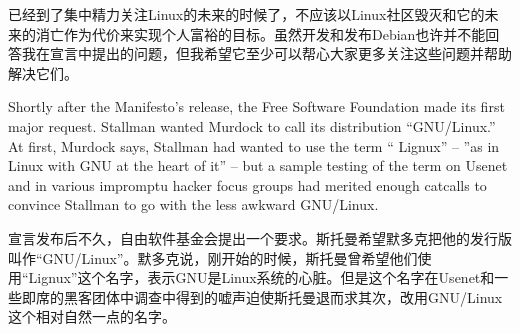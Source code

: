 \ifdefined\chs
已经到了集中精力关注Linux的未来的时候了，不应该以Linux社区毁灭和它的未来的消亡作为代价来实现个人富裕的目标。虽然开发和发布Debian也许并不能回答我在宣言中提出的问题，但我希望它至少可以帮心大家更多关注这些问题并帮助解决它们。
\fi

\ifdefined\eng
Shortly after the Manifesto's release, the Free Software Foundation made its first major request. Stallman wanted Murdock to call its distribution ``GNU/Linux.'' At first, Murdock says, Stallman had wanted to use the term `` Lignux'' -- ''as in Linux with GNU at the heart of it'' -- but a sample testing of the term on Usenet and in various impromptu hacker focus groups had merited enough catcalls to convince Stallman to go with the less awkward GNU/Linux.
\fi

\ifdefined\chs
宣言发布后不久，自由软件基金会提出一个要求。斯托曼希望默多克把他的发行版叫作``GNU/Linux''。默多克说，刚开始的时候，斯托曼曾希望他们使用``Lignux''这个名字，表示GNU是Linux系统的心脏。但是这个名字在Usenet和一些即席的黑客团体中调查中得到的嘘声迫使斯托曼退而求其次，改用GNU/Linux这个相对自然一点的名字。
\fi




